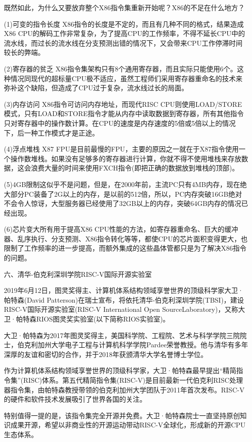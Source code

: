 \documentclass[utf8]{book}
\begin{document}
	既然如此，为什么又要放弃整个X86指令集重新开始呢？X86的不足在什么地方？
	
	(1)可变的指令长度 X86指令的长度是不定的，而且有几种不同的格式，结果造成X86 CPU的解码工作非常复杂，为了提高CPU的工作频率，不得不延长CPU中的流水线，而过长的流水线在分支预测出错的情况下，又会带来CPU工作停滞时间较长的弊端。
	
	(2)寄存器的贫乏 X86指令集架构只有8个通用寄存器，而且实际只能使用6个。这种情况同现代的超标量CPU极不适应，虽然工程师们采用寄存器重命名的技术来弥补这个缺陷，但造成了CPU过于复杂，流水线过长的局面。
	
	(3)内存访问 X86指令可访问内存地址，而现代RISC CPU则使用LOAD/STORE模式，只有LOAD和STORE指令才能从内存中读取数据到寄存器，所有其他指令只对寄存器中的操作数计算。在CPU的速度是内存速度的5倍或5倍以上的情况下，后一种工作模式才是正途。
	
	(4)浮点堆栈 X87 FPU是目前最慢的FPU，主要的原因之一就在于X87指令使用一个操作数堆栈。如果没有足够多的寄存器进行计算，你就不得不使用堆栈来存放数据，这会浪费大量的时间来使用FXCH指令(即把正确的数据放到堆栈的顶部)。
	
	(5)4GB限制这似乎不是问题，但是，在2000年前，主流PC只有4MB内存，现在绝大部分PC装备了2G以上的内存，是以前的512倍，所以，PC内存突破16GB绝对不会令人惊讶，大型服务器已经使用了32GB以上的内存，突破64GB内存的情况已经出现。
	
	(6)芯片变大所有用于提高X86 CPU性能的方法，如寄存器重命名、巨大的缓冲器、乱序执行、分支预测、X86指令转化等等，都使CPU的芯片面积变得更大，也限制了工作频率的进一步提高，而额外集成的这些晶体管都只是为了解决X86指令的问题。
	
	六、清华-伯克利深圳学院RISC-V国际开源实验室
	
	2019年6月12日，图灵奖得主、计算机体系结构领域享誉世界的顶级科学家大卫·帕特森(David Patterson)在瑞士宣布，将依托清华-伯克利深圳学院(TBSI)，建设RISC-V国际开源实验室(RISC-V  International Open SourceLaboratory)，又称大卫·帕特森RIOS图灵奖实验室(以下简称RIOS实验室)。
	
	
	大卫·帕特森为2017年图灵奖得主，美国科学院、工程院、艺术与科学学院三院院士，伯克利加州大学电子工程与计算机科学学院Pardee荣誉教授。他与清华有多年深厚的友谊和密切的合作，并于2018年获颁清华大学名誉博士学位。
	
	作为计算机体系结构领域享誉世界的顶级科学家，大卫·帕特森最早提出“精简指令集”(RISC)体系。第五代精简指令集(RISC-V)是目前最新一代伯克利RISC处理器指令集，由帕特森教授带领的伯克利加州大学团队于2011年首次发布。RISC-V的硬件和软件技术发展吸引了世界各国的关注。
	
	特别值得一提的是，该指令集完全开源并免费。大卫·帕特森院士一直坚持原创知识成果开源，希望以非商业性的开源运动带动RISC-V全球化，形成新的开源CPU生态体系。
	
\end{document}

